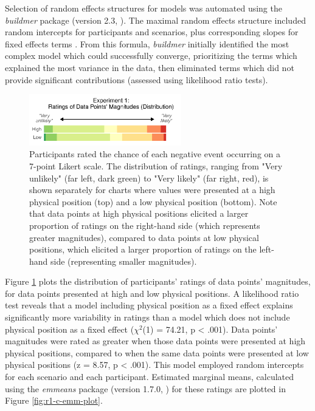 \documentclass[journal]{vgtc}                %
\begin{document}
Selection of random effects structures for models was automated using
the \emph{buildmer} package (version 2.3, \citep{voeten_buildmer_2022}). The maximal random
effects structure included random intercepts for participants and
scenarios, plus corresponding slopes for fixed effects terms
\citep{barr_random_2013}. From this formula, \emph{buildmer} initially identified
the most complex model which could successfully converge, prioritizing
the terms which explained the most variance in the data, then eliminated
terms which did not provide significant contributions (assessed using
likelihood ratio tests).

\begin{figure}
\includegraphics[width=250px]{position_magnitude_files/figure-latex/r1-c-plot-1} \caption{Participants rated the chance of each negative event occurring on a 7-point Likert scale. The distribution of ratings, ranging from "Very unlikely" (far left, dark green) to "Very likely" (far right, red), is shown separately for charts where values were presented at a high physical position (top) and a low physical position (bottom). Note that data points at high physical positions elicited a larger proportion of ratings on the right-hand side (which represents greater magnitudes), compared to data points at low physical positions, which elicited a larger proportion of ratings on the left-hand side (representing smaller magnitudes).}\label{fig:r1-c-plot}
\end{figure}

Figure \ref{fig:r1-c-plot} plots the distribution of participants'
ratings of data points' magnitudes, for data points presented at high
and low physical positions. A likelihood ratio test reveals that a model
including physical position as a fixed effect explains significantly
more variability in ratings than a model which does not include physical
position as a fixed effect (\(\chi^2\)(1) =
74.21, p \textless{} .001). Data
points' magnitudes were rated as greater when those data points were
presented at high physical positions, compared to when the same data
points were presented at low physical positions (z =
8.57, p
\textless{} .001). This model employed random
intercepts for each scenario and each participant. Estimated marginal
means, calculated using the \emph{emmeans} package (version 1.7.0, \citep{lenth_emmeans_2021}) for these ratings are plotted in Figure \ref{fig:r1-c-emm-plot}.
\end{document}
